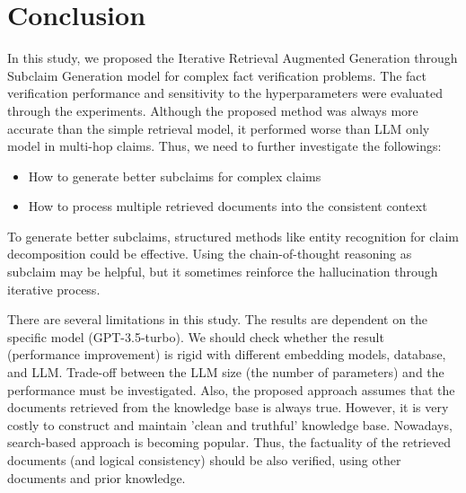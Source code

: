 \documentclass{article}
\begin{document}
\section{Conclusion}
In this study, we proposed the Iterative Retrieval Augmented Generation through Subclaim Generation model for complex fact verification problems. The fact verification performance and sensitivity to the hyperparameters were evaluated through the experiments. Although the proposed method was always more accurate than the simple retrieval model, it performed worse than LLM only model in multi-hop claims. Thus, we need to further investigate the followings:
\begin{itemize}
    \item How to generate better subclaims for complex claims
    \item How to process multiple retrieved documents into the consistent context
\end{itemize}
To generate better subclaims, structured methods like entity recognition for claim decomposition could be effective. Using the chain-of-thought reasoning as subclaim may be helpful, but it sometimes reinforce the hallucination through iterative process. \par

There are several limitations in this study. The results are dependent on the specific model (GPT-3.5-turbo). We should check whether the result (performance improvement) is rigid with different embedding models, database, and LLM. Trade-off between the LLM size (the number of parameters) and the performance must be investigated. Also, the proposed approach assumes that the documents retrieved from the knowledge base is always true. However, it is very costly to construct and maintain 'clean and truthful' knowledge base. Nowadays, search-based approach is becoming popular. Thus, the factuality of the retrieved documents (and logical consistency) should be also verified, using other documents and prior knowledge.





\end{document}
